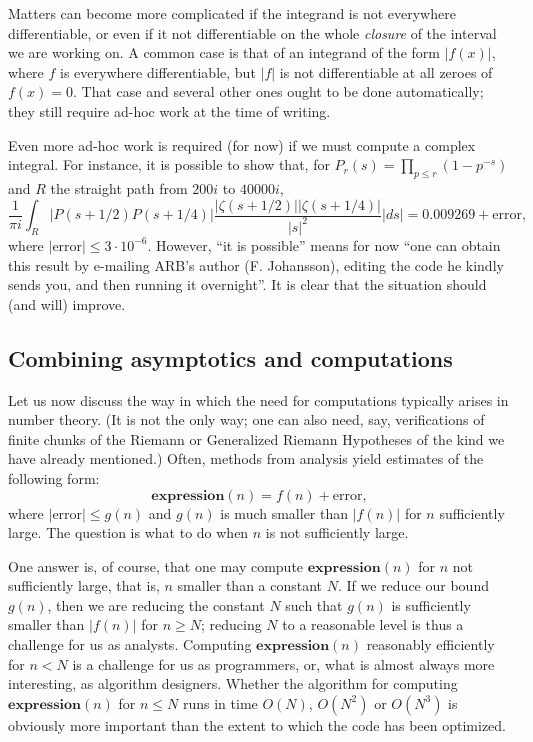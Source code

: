 Matters can become more complicated if the integrand is not everywhere
differentiable, or even if it not differentiable on the whole {\em closure}
of the interval we are working on. A common case is that of an integrand of the form $|f(x)|$,
where $f$ is everywhere differentiable, but $|f|$ is not differentiable at
all zeroes of $f(x)=0$. That case and several other ones ought to be done
automatically; they still require ad-hoc work at the time of writing.

Even more ad-hoc work is required (for now) if we must compute a complex integral. For instance,
it is possible to show that,
for $P_{r}(s) = \prod_{p\leq r} (1-p^{-s})$ and $R$ the straight path from
$200 i$ to $40000 i$,
\[\frac{1}{\pi i} \int_{R} |P(s+1/2) P(s+1/4)|
\frac{|\zeta(s+1/2)| |\zeta(s+1/4)|}{|s|^2} |d s| = 0.009269 + \text{error},\]
where $|\text{error}|\leq 3\cdot 10^{-6}$. However, ``it is possible'' means
for now ``one can obtain this result by e-mailing ARB's author
(F. Johansson), editing the code he kindly sends you, and then
running it overnight''. It is clear that the situation should (and will)
improve.

\subsection{Combining asymptotics and computations}\label{sec:asymcomp}

Let us now discuss the way in which
the need for computations typically arises in number
theory. (It is not the only way; one can also need, say, verifications of
finite chunks of the Riemann or Generalized Riemann Hypotheses of the kind we
have already mentioned.)
  Often, methods from analysis yield estimates of the following form:
  \begin{equation}\label{eq:experr}
    \textbf{expression}(n) = f(n) + \text{error},\end{equation}
  where $|\text{error}|\leq g(n)$ and $g(n)$ is much smaller than $|f(n)|$
  for $n$ sufficiently large. The question is what to do when $n$ is not
  sufficiently large.

  One answer is, of course, that one may compute $\textbf{expression}(n)$ for
  $n$ not sufficiently large, that is, $n$ smaller than a constant $N$.
  If we reduce our bound $g(n)$, then we are reducing the constant $N$ such that
  $g(n)$ is sufficiently smaller than $|f(n)|$ for $n\geq N$; reducing $N$
  to a reasonable level is thus a challenge for us as analysts.
  Computing $\textbf{expression}(n)$ reasonably efficiently for $n<N$ is
  a challenge for us as programmers, or, what is almost always more
  interesting,  as algorithm designers. Whether the algorithm 
  for computing $\textbf{expression}(n)$ for $n\leq N$ runs in time
  $O(N)$, $O(N^2)$ or $O(N^3)$ is obviously more important than the extent
  to which the code has been optimized.

